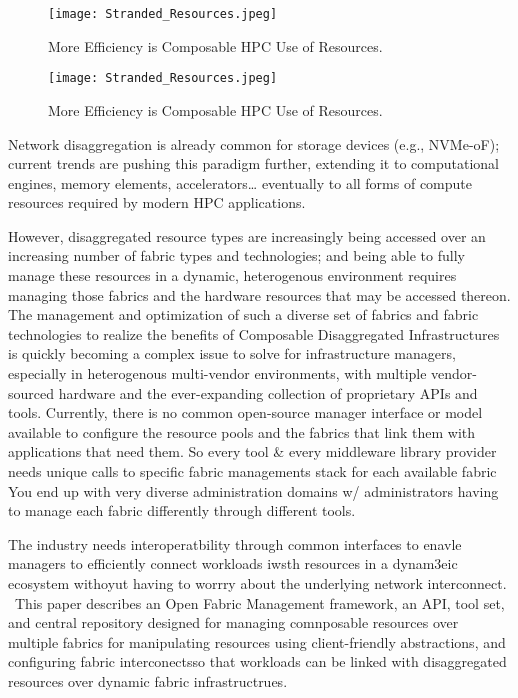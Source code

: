 \begin{figure}[stranded]
\centerline{\texttt{[image: Stranded\_Resources.jpeg]}}
\caption{More Efficiency is Composable HPC Use of Resources.} \label{Fig:stranded}
\end{figure}

\begin{figure}[Pools]
\centerline{\texttt{[image: Stranded\_Resources.jpeg]}}
\caption{More Efficiency is Composable HPC Use of Resources.} \label{Fig:Pools}
\end{figure}

Network disaggregation is already common for storage devices (e.g., NVMe-oF); current trends are pushing this paradigm further, extending it to computational engines, memory elements, accelerators… eventually to all forms of compute resources required by modern HPC applications.  

However, disaggregated resource types are increasingly being accessed over an increasing number of fabric types and technologies; and being able to fully manage these resources in a dynamic, heterogenous environment requires managing those fabrics and the hardware resources that may be accessed thereon. The management and optimization of such a diverse set of fabrics and fabric technologies to realize the benefits of Composable Disaggregated Infrastructures is quickly becoming a complex issue to solve for infrastructure managers, especially in heterogenous multi-vendor environments, with multiple vendor-sourced hardware and the ever-expanding collection of proprietary APIs and tools. Currently, there is no common open-source manager interface or model available to configure the resource pools and the fabrics that link them with applications that need them. So every tool & every middleware library provider needs unique calls to specific fabric managements stack for each available fabric You end up with very diverse administration domains w/ administrators having to manage each fabric differently through different tools.

The industry needs interoperatbility through common interfaces to enavle managers to efficiently connect workloads iwsth resources in a dynam3eic ecosystem withoyut having to worrry about the underlying network interconnect.  This paper describes an Open Fabric Management framework, an API, tool set, and central repository designed for managing comnposable resources over multiple fabrics for manipulating resources using client-friendly abstractions, and configuring fabric interconectsso that workloads can be linked with disaggregated resources over dynamic fabric infrastructrues.

